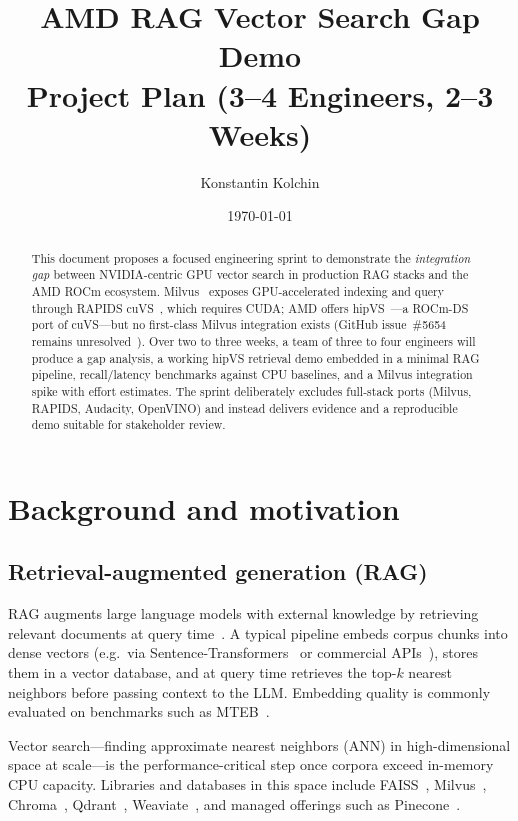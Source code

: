 \documentclass[11pt,a4paper]{article}
\title{AMD RAG Vector Search Gap Demo\\[0.4em]
\large Project Plan (3--4 Engineers, 2--3 Weeks)}
\author{Konstantin Kolchin}
\date{\today}
\begin{document}
\maketitle

\begin{abstract}
This document proposes a focused engineering sprint to demonstrate the
\emph{integration gap} between NVIDIA-centric GPU vector search in production
RAG stacks and the AMD ROCm ecosystem.
Milvus~\cite{milvus-home,milvus-osdi21} exposes GPU-accelerated indexing and
query through RAPIDS cuVS~\cite{cuvs-docs,rapids-home}, which requires CUDA;
AMD offers hipVS~\cite{hipvs-docs,hipvs-github}---a ROCm-DS port of cuVS---but
no first-class Milvus integration exists (GitHub issue~\#5654 remains
unresolved~\cite{milvus-rocm-issue}).
Over two to three weeks, a team of three to four engineers will produce a gap
analysis, a working hipVS retrieval demo embedded in a minimal RAG pipeline,
recall/latency benchmarks against CPU baselines, and a Milvus integration spike
with effort estimates.
The sprint deliberately excludes full-stack ports (Milvus, RAPIDS, Audacity,
OpenVINO) and instead delivers evidence and a reproducible demo suitable for
stakeholder review.
\end{abstract}

\section{Background and motivation}
\label{sec:background}

\subsection{Retrieval-augmented generation (RAG)}

RAG augments large language models with external knowledge by retrieving
relevant documents at query time~\cite{rag-lewis2020,langchain-rag,llamaindex-rag}.
A typical pipeline embeds corpus chunks into dense vectors
(e.g.\ via Sentence-Transformers~\cite{sentence-transformers} or commercial
APIs~\cite{openai-embeddings}), stores them in a vector database, and at query
time retrieves the top-$k$ nearest neighbors before passing context to the LLM.
Embedding quality is commonly evaluated on benchmarks such as
MTEB~\cite{mteb}.

Vector search---finding approximate nearest neighbors (ANN) in high-dimensional
space at scale---is the performance-critical step once corpora exceed in-memory
CPU capacity.
Libraries and databases in this space include FAISS~\cite{faiss-github,faiss-arxiv},
Milvus~\cite{milvus-home,milvus-github}, Chroma~\cite{chromadb}, Qdrant~\cite{qdrant},
Weaviate~\cite{weaviate}, and managed offerings such as Pinecone~\cite{pinecone-arch}.
\end{document}
